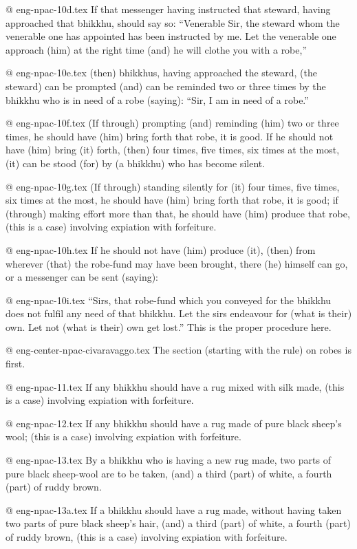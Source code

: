 @ eng-npac-10d.tex
If that messenger having instructed that steward, having approached that bhikkhu, should say so: “Venerable Sir, the steward whom the venerable one has appointed has been instructed by me. Let the venerable one approach (him) at the right time (and) he will clothe you with a robe,”

@ eng-npac-10e.tex
(then) bhikkhus, having approached the steward, (the steward) can be prompted (and) can be reminded two or three times by the bhikkhu who is in need of a robe (saying): “Sir, I am in need of a robe.”

@ eng-npac-10f.tex
(If through) prompting (and) reminding (him) two or three times, he should have (him) bring forth that robe, it is good. If he should not have (him) bring (it) forth, (then) four times, five times, six times at the most, (it) can be stood (for) by (a bhikkhu) who has become silent.

@ eng-npac-10g.tex
(If through) standing silently for (it) four times, five times, six times at the most, he should have (him) bring forth that robe, it is good; if (through) making effort more than that, he should have (him) produce that robe, (this is a case) involving expiation with forfeiture.

@ eng-npac-10h.tex
If he should not have (him) produce (it), (then) from wherever (that) the robe-fund may have been brought, there (he) himself can go, or a messenger can be sent (saying):

@ eng-npac-10i.tex
“Sirs, that robe-fund which you conveyed for the bhikkhu does not fulfil any need of that bhikkhu. Let the sirs endeavour for (what is their) own. Let not (what is their) own get lost.” This is the proper procedure here.

@ eng-center-npac-civaravaggo.tex
The section (starting with the rule) on robes is first.

@ eng-npac-11.tex
If any bhikkhu should have a rug mixed with silk made, (this is a case) involving expiation with forfeiture.

@ eng-npac-12.tex
If any bhikkhu should have a rug made of pure black sheep's wool; (this is a case) involving expiation with forfeiture.

@ eng-npac-13.tex
By a bhikkhu who is having a new rug made, two parts of pure black sheep-wool are to be taken, (and) a third (part) of white, a fourth (part) of ruddy brown.

@ eng-npac-13a.tex
If a bhikkhu should have a rug made, without having taken two parts of pure black sheep's hair, (and) a third (part) of white, a fourth (part) of ruddy brown, (this is a case) involving expiation with forfeiture.

